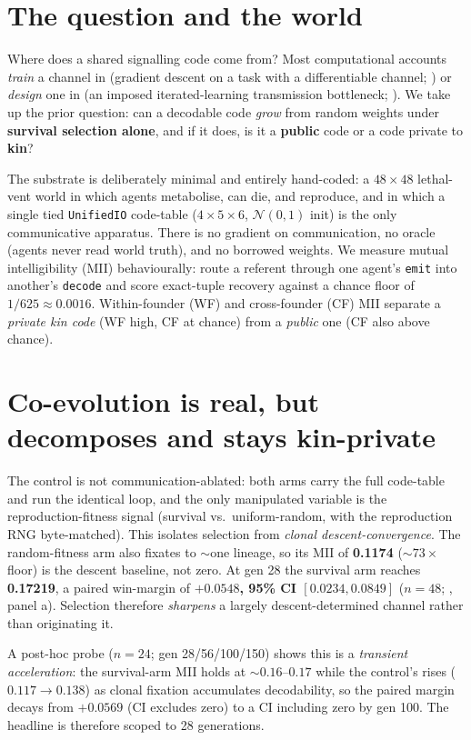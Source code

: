\documentclass[letterpaper]{article}
\begin{document}
\section{The question and the world}
Where does a shared signalling code come from? Most computational accounts \emph{train} a
channel in (gradient descent on a task with a differentiable channel; \citealp{foerster2016,
lazaridou2017}) or \emph{design} one in (an imposed iterated-learning transmission bottleneck;
\citealp{kirby2008, ren2020}). We take up the prior question: can a decodable code \emph{grow}
from random weights under \textbf{survival selection alone}, and if it does, is it a
\textbf{public} code or a code private to \textbf{kin}?

The substrate is deliberately minimal and entirely hand-coded: a $48\times48$ lethal-vent
world in which agents metabolise, can die, and reproduce, and in which a single tied
\texttt{UnifiedIO} code-table ($4\times5\times6$, $\mathcal{N}(0,1)$ init) is the only
communicative apparatus. There is no gradient on communication, no oracle (agents never read
world truth), and no borrowed weights. We measure mutual intelligibility (MII) behaviourally:
route a referent through one agent's \texttt{emit} into another's \texttt{decode} and score
exact-tuple recovery against a chance floor of $1/625 \approx 0.0016$. Within-founder (WF) and
cross-founder (CF) MII separate a \emph{private kin code} (WF high, CF at chance) from a
\emph{public} one (CF also above chance).

\section{Co-evolution is real, but decomposes and stays kin-private}
The control is not communication-ablated: both arms carry the full code-table and run the
identical loop, and the only manipulated variable is the reproduction-fitness signal (survival
vs.\ uniform-random, with the reproduction RNG byte-matched). This isolates selection from
\emph{clonal descent-convergence}. The random-fitness arm also fixates to ${\sim}$one lineage,
so its MII of \textbf{0.1174} (${\sim}73\times$ floor) is the descent baseline, not zero. At
gen 28 the survival arm reaches \textbf{0.17219}, a paired win-margin of \textbf{$+0.0548$,
95\% CI $[0.0234, 0.0849]$} ($n{=}48$; , panel a). Selection therefore
\emph{sharpens} a largely descent-determined channel rather than originating it.

A post-hoc probe ($n{=}24$; gen 28/56/100/150) shows this is a \emph{transient acceleration}:
the survival-arm MII holds at ${\sim}0.16$--$0.17$ while the control's rises ($0.117 \to 0.138$)
as clonal fixation accumulates decodability, so the paired margin decays from $+0.0569$ (CI
excludes zero) to a CI including zero by gen 100. The headline is therefore scoped to 28
generations.
\end{document}
